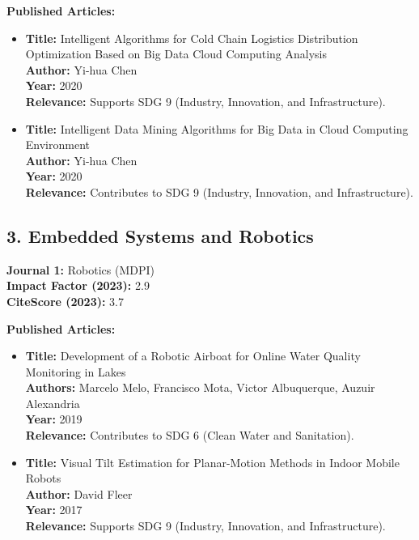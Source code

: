 \documentclass[11pt]{article}
\begin{document}
\textbf{Published Articles:}
\begin{itemize}
    \item \textbf{Title:} Intelligent Algorithms for Cold Chain Logistics Distribution Optimization Based on Big Data Cloud Computing Analysis \\
    \textbf{Author:} Yi-hua Chen \\
    \textbf{Year:} 2020 \\
    \textbf{Relevance:} Supports SDG 9 (Industry, Innovation, and Infrastructure).

    \item \textbf{Title:} Intelligent Data Mining Algorithms for Big Data in Cloud Computing Environment \\
    \textbf{Author:} Yi-hua Chen \\
    \textbf{Year:} 2020 \\
    \textbf{Relevance:} Contributes to SDG 9 (Industry, Innovation, and Infrastructure).
\end{itemize}

\subsection*{3. Embedded Systems and Robotics}

\textbf{Journal 1:} Robotics (MDPI) \\
\textbf{Impact Factor (2023):} 2.9 \\
\textbf{CiteScore (2023):} 3.7

\textbf{Published Articles:}
\begin{itemize}
    \item \textbf{Title:} Development of a Robotic Airboat for Online Water Quality Monitoring in Lakes \\
    \textbf{Authors:} Marcelo Melo, Francisco Mota, Victor Albuquerque, Auzuir Alexandria \\
    \textbf{Year:} 2019 \\
    \textbf{Relevance:} Contributes to SDG 6 (Clean Water and Sanitation).

    \item \textbf{Title:} Visual Tilt Estimation for Planar-Motion Methods in Indoor Mobile Robots \\
    \textbf{Author:} David Fleer \\
    \textbf{Year:} 2017 \\
    \textbf{Relevance:} Supports SDG 9 (Industry, Innovation, and Infrastructure).
\end{itemize}
\end{document}
